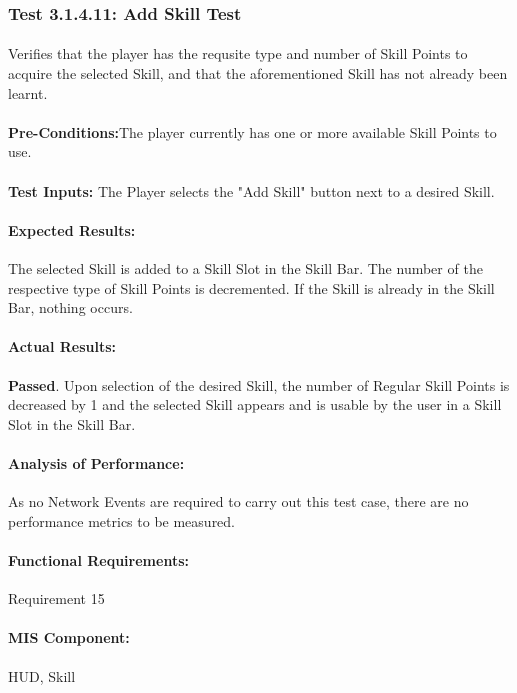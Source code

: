 \documentclass{article}
\begin{document}
    \subsubsection{Test 3.1.4.11: Add Skill Test}
    \paragraph{} Verifies that the player has the requsite type and number of Skill Points to acquire the selected Skill, and that the aforementioned Skill has not already been learnt.
    \paragraph{}\textbf{Pre-Conditions:}The player currently has one or more available Skill Points to use.
    \paragraph{}\textbf{Test Inputs:} The Player selects the "Add Skill" button next to a desired Skill.
    \paragraph{Expected Results:} The selected Skill is added to a Skill Slot in the Skill Bar. The number of the respective type of Skill Points is decremented. If the Skill is already in the Skill Bar, nothing occurs. 
    \paragraph{Actual Results:} \textbf{Passed}. Upon selection of the desired Skill, the number of Regular Skill Points is decreased by 1 and the selected Skill appears and is usable by the user in a Skill Slot in the Skill Bar.
    \paragraph{Analysis of Performance:} As no Network Events are required to carry out this test case, there are no performance metrics to be measured.
     \paragraph{Functional Requirements:} Requirement 15
    \paragraph{MIS Component:} HUD, Skill
    
\end{document}
